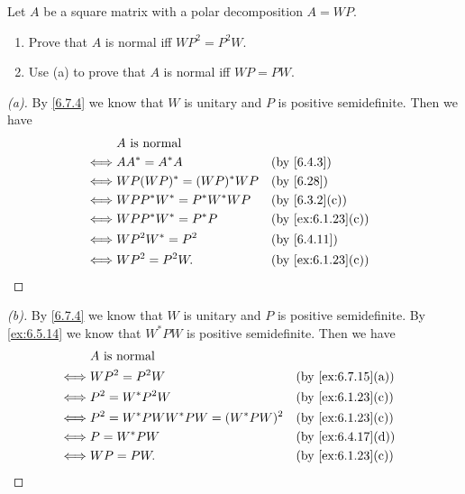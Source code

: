 \begin{ex}\label{ex:6.7.15}
  Let \(A\) be a square matrix with a polar decomposition \(A = WP\).
  \begin{enumerate}
    \item Prove that \(A\) is normal iff \(W P^2 = P^2 W\).
    \item Use (a) to prove that \(A\) is normal iff \(WP = PW\).
  \end{enumerate}
\end{ex}

\begin{proof}[(a)]
  By \cref{6.7.4} we know that \(W\) is unitary and \(P\) is positive semidefinite.
  Then we have
  \begin{align*}
         & A \text{ is normal}                              \\
    \iff & A A^* = A^* A             &  & \by{6.4.3}        \\
    \iff & WP (WP)^* = (WP)^* WP     &  & \by{6.28}         \\
    \iff & W P P^* W^* = P^* W^* W P &  & \by{6.3.2}[c]     \\
    \iff & W P P^* W^* = P^* P       &  & \by{ex:6.1.23}[c] \\
    \iff & W P^2 W^* = P^2           &  & \by{6.4.11}       \\
    \iff & W P^2 = P^2 W.            &  & \by{ex:6.1.23}[c]
  \end{align*}
\end{proof}

\begin{proof}[(b)]
  By \cref{6.7.4} we know that \(W\) is unitary and \(P\) is positive semidefinite.
  By \cref{ex:6.5.14} we know that \(W^* P W\) is positive semidefinite.
  Then we have
  \begin{align*}
         & A \text{ is normal}                                        \\
    \iff & W P^2 = P^2 W                       &  & \by{ex:6.7.15}[a] \\
    \iff & P^2 = W^* P^2 W                     &  & \by{ex:6.1.23}[c] \\
    \iff & P^2 = W^* P W W^* P W = (W^* P W)^2 &  & \by{ex:6.1.23}[c] \\
    \iff & P = W^* P W                         &  & \by{ex:6.4.17}[d] \\
    \iff & WP = PW.                            &  & \by{ex:6.1.23}[c]
  \end{align*}
\end{proof}

